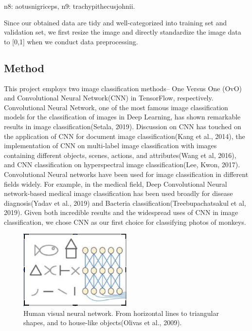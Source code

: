 \documentclass[12pt, letterpaper]{article}
\begin{document}
    n8: aotusnigriceps, n9: trachypithecusjohnii.

        \bigskip
        Since our obtained data are tidy and well-categorized into training set and validation set, we first resize the image and directly standardize the image data to [0,1] when we conduct data preprocessing.

\subsection{Method}
       \quad \quad This project employs two image classification methods-- One Versus One (OvO) and Convolutional Neural Network(CNN) in TensorFlow, respectively. Convolutional Neural Network, one of the most famous image classification models for the classification of images in Deep Learning, has shown remarkable results in image classification(Setala, 2019). Discussion on CNN has touched on the application of CNN for document image classification(Kang et al., 2014), the implementation of CNN on multi-label image classification with images containing different objects, scenes, actions, and attributes(Wang et al, 2016), and CNN classification on hyperspectral image classification(Lee, Kwon, 2017). Convolutional Neural networks have been used for image classification in different fields widely. For example, in the medical field, Deep Convolutional Neural network-based medical image classification has been used broadly for disease diagnosis(Yadav et al., 2019) and Bacteria classification(Treebupachatsakul et al, 2019). Given both incredible results and the widespread uses of CNN in image classification, we chose CNN as our first choice for classifying photos of monkeys.
       
                      
        \begin{figure}
        \centering
        \includegraphics[width=0.5\textwidth]{image3.png}
        \caption{\label{fig:image3}Human visual neural network. From horizontal lines to triangular shapes, and to house-like objects(Olivas et al., 2009).}
        \end{figure}   
        
\end{document}
